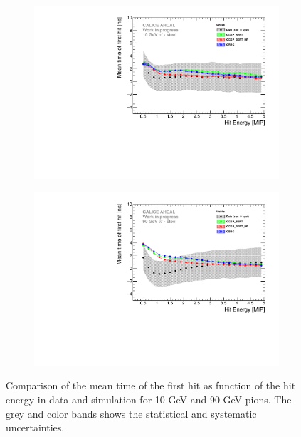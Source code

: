 \begin{figure}[htbp!]
	\begin{subfigure}[t]{0.5\textwidth}
		\centering
		\includegraphics[width=1\textwidth]{../Thesis_Plots/Timing/Pions/Plots/ComparisonToSim/Time_Energy_10GeV_Mokka.pdf}
		\caption{} \label{fig:Energy_SimData_10GeV}
	\end{subfigure}
	\hfill
	\begin{subfigure}[t]{0.5\textwidth}
		\centering
		\includegraphics[width=1\textwidth]{../Thesis_Plots/Timing/Pions/Plots/ComparisonToSim/Time_Energy_90GeV_Mokka.pdf}
		\caption{} \label{fig:Energy_SimData_90GeV}
	\end{subfigure}
	\caption{Comparison of the mean time of the first hit as function of the hit energy in data and \mokka simulation for 10 GeV and 90 GeV pions. The grey and color bands shows the statistical and systematic uncertainties.}
\end{figure}

